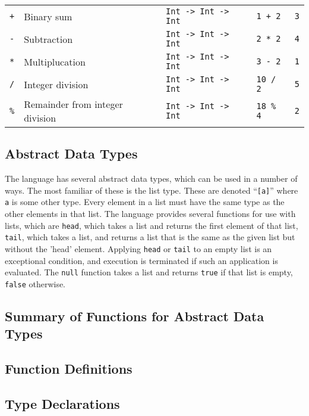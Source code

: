 \documentclass{article}
\begin{document}
{\begin{tabular}{ | l | l | l | l | l | }
    \texttt{+}      & Binary sum                        & \texttt{Int -> Int -> Int}            & \texttt{1 + 2}            & \texttt{3}                    \\
    \texttt{-}      & Subtraction                       & \texttt{Int -> Int -> Int}            & \texttt{2 * 2}            & \texttt{4}                    \\
    \texttt{*}      & Multiplucation                    & \texttt{Int -> Int -> Int}            & \texttt{3 - 2}            & \texttt{1}                    \\
    \texttt{/}      & Integer division                  & \texttt{Int -> Int -> Int}            & \texttt{10 / 2}           & \texttt{5}                    \\
    \texttt{\%}     & Remainder from integer division   & \texttt{Int -> Int -> Int}            & \texttt{18 \% 4}          & \texttt{2}                    \\
    \hline
\end{tabular}}

\subsection{Abstract Data Types}
The language has several abstract data types, which can be used in a number of ways. The most familiar of these is the list type. These are denoted ``\texttt{[a]}'' where \texttt{a} is some other type. Every element in a list must have the same type as the other elements in that list. The language provides several functions for use with lists, which are \texttt{head}, which takes a list and returns the first element of that list, \texttt{tail}, which takes a list, and returns a list that is the same as the given list but without the 'head' element. Applying \texttt{head} or \texttt{tail} to an empty list is an exceptional condition, and execution is terminated if such an application is evaluated. The \texttt{null} function takes a list and returns \texttt{true} if that list is empty, \texttt{false} otherwise.
\subsection{Summary of Functions for Abstract Data Types}
\subsection{Function Definitions}
\subsection{Type Declarations}
\end{document}
